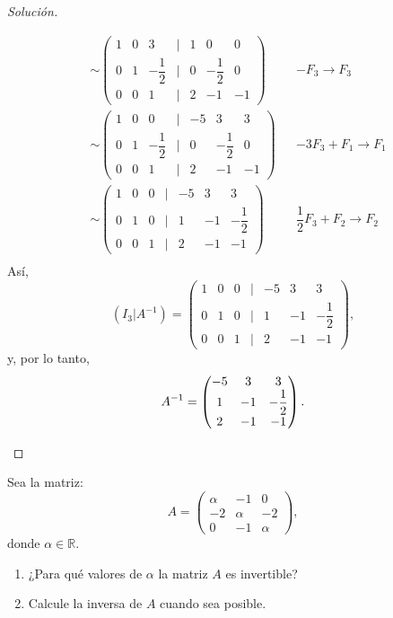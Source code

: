 \documentclass[a4,11pt]{aleph-notas}
\begin{document}
\begin{proof}[Solución]
\begin{enumerate}
\begin{align*}
            & \sim \begin{pmatrix}
                1 & 0 & 3 & | & 1 & 0 & 0 \\
                0 & 1 & -\dfrac{1}{2} & | & 0 & -\dfrac{1}{2} & 0 \\
                0 & 0 & 1 & | & 2 & -1 & -1 
            \end{pmatrix} && - F_3 \rightarrow F_3 \\
            & \sim \begin{pmatrix}
                1 & 0 & 0 & | & -5 & 3 & 3 \\
                0 & 1 & -\dfrac{1}{2} & | & 0 & -\dfrac{1}{2} & 0 \\
                0 & 0 & 1 & | & 2 & -1 & -1 
            \end{pmatrix} && - 3 F_3 + F_1 \rightarrow F_1 \\
            & \sim \begin{pmatrix}
                1 & 0 & 0 & | & -5 & 3 & 3 \\
                0 & 1 & 0 & | & 1 & -1 & -\dfrac{1}{2} \\
                0 & 0 & 1 & | & 2 & -1 & -1 
            \end{pmatrix} && \dfrac{1}{2} F_3 + F_2 \rightarrow F_2 \\
        \end{align*}
        Así, 
        \[
            (I_3|A^{-1}) = \begin{pmatrix}
                1 & 0 & 0 & | & -5 & 3 & 3 \\
                0 & 1 & 0 & | & 1 & -1 & -\dfrac{1}{2} \\
                0 & 0 & 1 & | & 2 & -1 & -1 
            \end{pmatrix},
        \]
        y, por lo tanto, 
        \[
            A^{-1} = \begin{pmatrix}
                -5 & 3 & 3 \\
                 1 & -1 & -\dfrac{1}{2} \\
                 2 & -1 & -1 
            \end{pmatrix}. \qedhere
        \]
    \end{enumerate}
\end{proof}

\begin{ejer}
    Sea la matriz:
    \[
        A= \begin{pmatrix}
            \alpha & -1 & 0 \\
            -2 & \alpha & -2 \\
            0 & -1 & \alpha
        \end{pmatrix},
    \]
    donde $\alpha \in \mathbb{R}$.
    \begin{enumerate}
    \item 
        ¿Para qu\'{e} valores de $\alpha$ la matriz $A$ es invertible? 
    \item 
        Calcule la inversa de $A$ cuando sea posible.
    \end{enumerate}
\end{ejer}
\end{document}
